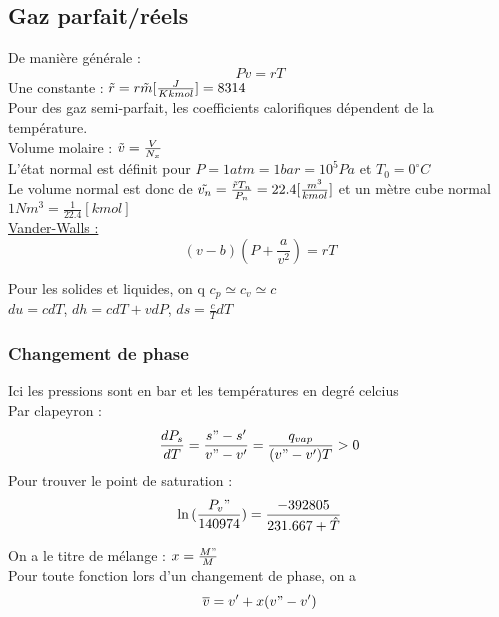 \documentclass[../main.tex]{subfiles}
\begin{document}
\subsection{Gaz parfait/réels}
De manière générale : \\
\begin{equation}
    Pv = rT
\end{equation}
Une constante : $\Tilde{r} = r\Tilde{m} [\frac{J}{K kmol}] = 8314$\\
Pour des gaz semi-parfait, les coefficients calorifiques dépendent de la température.\\
Volume molaire : $\Tilde{v} = \frac{V}{N_x}$\\

L'état normal est définit pour $P= 1atm = 1bar = 10^5Pa$ et $T_0 = 0^{\circ}C$\\
Le volume normal est donc de $\Tilde{v_n} = \frac{\Tilde{r} T_n}{P_n} = 22.4 [\frac{m^3}{kmol}]$ et un mètre cube normal $1Nm^3 = \frac{1}{22.4}[kmol]$\\

\quad \underline{Vander-Walls :}\\
\begin{equation}
    (v-b)(P+\frac{a}{v^2})=rT
\end{equation}

Pour les solides et liquides, on q $c_p \simeq c_v \simeq c$\\
$du = cdT$, $dh=cdT+vdP$, $ds = \frac{c}{T}dT$\\

\subsubsection{Changement de phase}
\warning Ici les pressions sont en bar et les températures en degré celcius\\
Par clapeyron :\\
\begin{equation}
    \frac{dP_s}{dT} = \frac{s"-s'}{v"-v'} = \frac{q_{vap}}{(v"-v')T} > 0
\end{equation}
Pour trouver le point de saturation :\\
\begin{equation}
    \ln{(\frac{P_v"}{140974})} = \frac{-392805}{231.667+\hat{T}}
\end{equation}

On a le titre de mélange : $x = \frac{M"}{M}$\\
Pour toute fonction lors d'un changement de phase, on a \\
\begin{equation}
    \overline{v} = v' + x(v"-v')
\end{equation}
\end{document}

